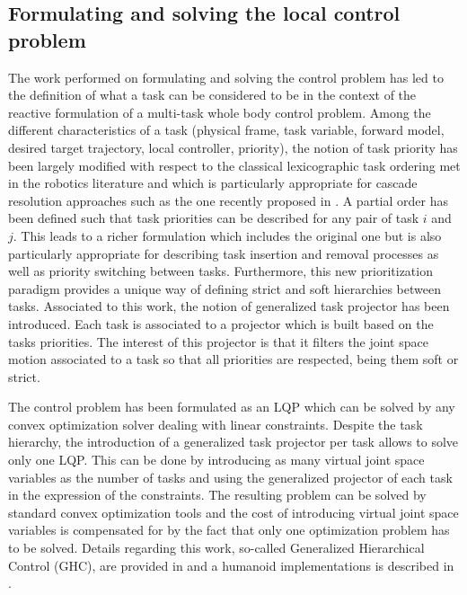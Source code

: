 \documentclass[final,5p,twocolumn]{elsarticle}
\begin{document}
\subsection{Formulating and solving the local control problem}

The work performed on formulating  and solving the control problem has led to the definition of what a task can be considered to be in the context of the reactive formulation of a multi-task whole body control problem. Among the different characteristics of a task (physical frame, task variable, forward model, desired target trajectory, local controller, priority), the notion of task priority has been largely modified with respect to the classical lexicographic task ordering met in the robotics literature and which is particularly appropriate for cascade resolution approaches such as the one recently proposed in \cite{escande2012}. A partial order has been defined such that task priorities can be described for any pair of task $i$ and $j$. This leads to a richer formulation which includes the original one but is also particularly appropriate for describing task insertion and removal processes as well as priority switching between tasks. Furthermore, this new prioritization paradigm provides a unique way of defining strict and soft hierarchies between tasks. Associated to this work, the notion  of generalized task projector has been introduced. Each task is associated to a projector which is built based on the tasks priorities. The interest of this projector is that it filters the joint space motion associated to a task so that all priorities are respected, being them soft or strict.

The control problem has been formulated as an LQP \cite{Salini-2011-ID348} which can be solved by any convex optimization solver dealing with linear constraints. Despite the task hierarchy, the introduction of a generalized task projector per task allows to solve only one LQP. This can be done by introducing as many virtual joint space variables as the number of tasks and using the generalized projector of each task in the expression of the constraints. The resulting problem can be solved by standard convex optimization tools and the cost of introducing virtual joint space variables is compensated for by the fact that only one optimization problem has to be solved. Details regarding this work, so-called Generalized Hierarchical Control (GHC), are provided in \cite{liuGHC2015} and a humanoid implementations is described in \cite{LiuAutRobSpecIssue2015}. 
\end{document}

